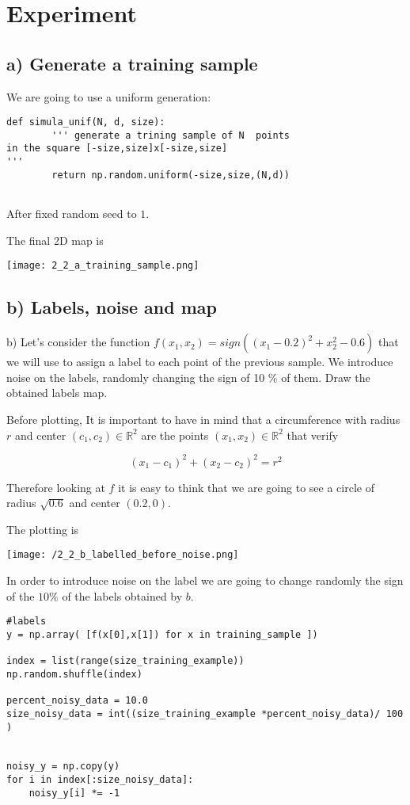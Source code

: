 \section{Experiment }

\subsection{a) Generate a training sample}

We are going to use a uniform generation:

\begin{verbatim}
def simula_unif(N, d, size):
        ''' generate a trining sample of N  points
in the square [-size,size]x[-size,size]
'''
        return np.random.uniform(-size,size,(N,d))
 
\end{verbatim}

After fixed random seed to $1$.

The final 2D map  is

\texttt{[image: 2\_2\_a\_training\_sample.png]}

\subsection{b) Labels, noise and map}

b) Let's consider the function $f(x_1, x_2) = sign((x_1 - 0.2)^2 + x_2^2 - 0.6)$ that we will use to assign a label to each point of the previous sample. We introduce noise on the labels, randomly changing the sign of 10 \% of them.
Draw the obtained labels map.


Before plotting, It is important to have in mind that a circumference with radius $r$ and center $(c_1, c_2) \in \mathbb R^2$ are the points $(x_1, x_2) \in \mathbb R^2$ that verify 

\[ (x_1 - c_1)^2 + (x_2 - c_2)^2 = r^2\]

Therefore looking at $f$ it is easy to think that we are going to see a circle of radius $\sqrt{0.6}$ and center $(0.2, 0)$.

The plotting is

\texttt{[image: /2\_2\_b\_labelled\_before\_noise.png]}

In order to introduce noise on the label we are going to change randomly the sign of the $10\%$ of  the labels obtained by $b$.



\begin{verbatim}
#labels 
y = np.array( [f(x[0],x[1]) for x in training_sample ])

index = list(range(size_training_example))
np.random.shuffle(index)

percent_noisy_data = 10.0
size_noisy_data = int((size_training_example *percent_noisy_data)/ 100 )


noisy_y = np.copy(y)
for i in index[:size_noisy_data]:
    noisy_y[i] *= -1

  \end{verbatim}

